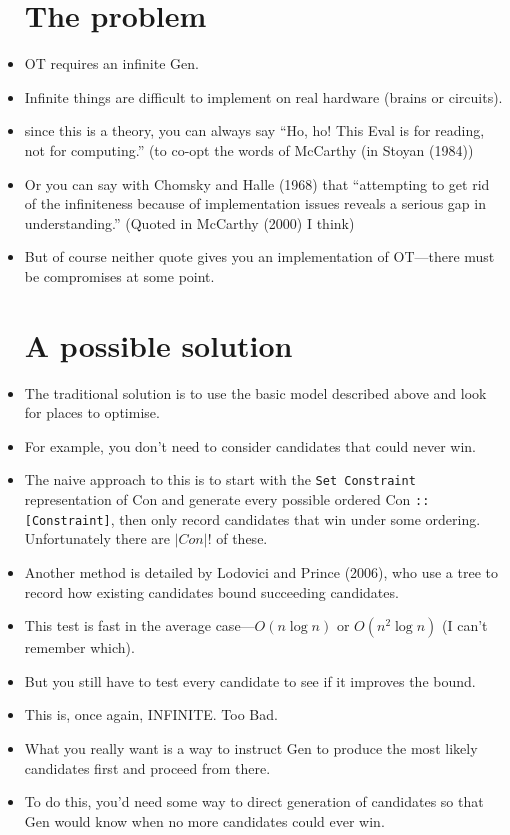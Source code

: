 \documentclass{article}[11pt]
\begin{document}
\begin{itemize}
\section{The problem}
\item OT requires an infinite {\sc Gen}.
\item Infinite things are difficult to implement on real hardware (brains or circuits).
\item since this is a theory, you can always say ``Ho, ho! This {\sc Eval}
  is for reading, not for computing.'' (to co-opt the words of McCarthy
  (in Stoyan (1984))
\item Or you can say with Chomsky and Halle (1968) that ``attempting to get rid
  of the infiniteness because of implementation issues reveals a serious gap in
  understanding.'' (Quoted in McCarthy (2000) I think)
\item But of course neither quote gives you an implementation of OT---there
  must be compromises at some point.
  \section{A possible solution}
\item The traditional solution is to use the basic model described above and
  look for places to optimise.
\item For example, you don't need to consider candidates that could never win.
\item The naive approach to this is to start with the \verb+Set Constraint+
  representation of {\sc Con} and generate every possible ordered
  {\sc Con} \verb+:: [Constraint]+, then only record candidates that win under some
  ordering. Unfortunately there are $|Con|!$ of these.
\item Another method is detailed by Lodovici and Prince (2006), who use a tree
  to record how existing candidates bound succeeding candidates.
\item This test is fast in the average case---$O(n \log n)$ or $O(n^2 \log n)$
  (I can't remember which).
\item But you still have to test every candidate to see if it improves the bound.
\item This is, once again, INFINITE. Too Bad.
\item What you really want is a way to instruct {\sc Gen} to produce the most likely
  candidates first and proceed from there.
\item To do this, you'd need some way to direct generation of candidates
  so that {\sc Gen} would know when no more candidates could ever win.

\end{itemize}
\end{document}
